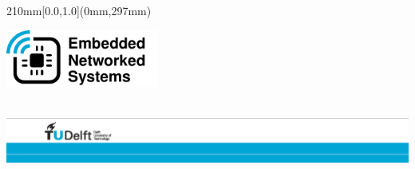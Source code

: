 \begin {textblock*}{210mm}[0.0,1.0](0mm,297mm)
\noindent
\hspace{1.89cm}

\hfill\parbox{5cm}{
\includegraphics[width=5cm]{template-pics/tud-ens-logo-tikz/tud-ens-logo}} %
\hspace*{2cm}\\

\vspace*{1.5cm}
\noindent
\includegraphics[width=\textwidth]{template-pics/TU_border_A4_L_front} %
\end{textblock*}

\null\newpage